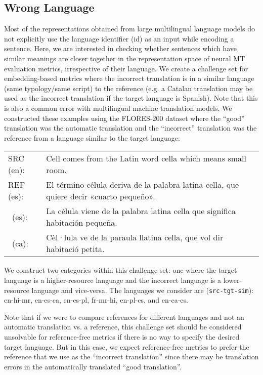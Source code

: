 \documentclass[11pt]{article}
\newcommand{\cmark}{\textcolor{darkpastelgreen}{\ding{51}}}\newcommand{\xmark}{\textcolor{darkpastelred}{\ding{55}}}
\begin{document}
\subsection{Wrong Language}
\label{sec:wrong_language}
Most of the representations obtained from large multilingual language models do not explicitly use the language identifier (id) as an input while encoding a sentence. Here, we are interested in checking whether sentences which have similar meanings are closer together in the representation space of neural MT evaluation metrics, irrespective of their language.  We create a challenge set for embedding-based metrics where the incorrect translation is in a similar language (same typology/same script) to the reference (e.g. a Catalan translation may be used as the incorrect translation if the target language is Spanish). Note that this is also a common error with multilingual machine translation models. We constructed these examples using the FLORES-200 dataset where the ``good'' translation was the automatic translation and the ``incorrect'' translation was the reference from a language similar to the target language:


\begin{small}
\vspace{0.5cm}
\setlength{\extrarowheight}{0.1cm}
\begin{tabularx}{0.95\columnwidth}{lX}
     SRC (en): & Cell comes from the Latin word cella which means small room. \\
     REF (es): & El término célula deriva de la palabra latina cella, que quiere decir «cuarto pequeño». \\
     \cmark\ (es): & La célula viene de la palabra latina cella que significa habitación pequeña. \\
     \xmark\ (ca): & Cèl·lula ve de la paraula llatina cella, que vol dir habitació petita. \vspace{0.35cm}
\end{tabularx}
\end{small}

We construct two categories within this challenge set: one where the target language is a higher-resource language and the incorrect language is a lower-resource language and vice-versa. The languages we consider are (\texttt{src-tgt-sim}): en-hi-mr, en-es-ca, en-cs-pl, fr-mr-hi,  en-pl-cs, and en-ca-es.

Note that if we were to compare references for different languages and not an automatic translation vs. a reference, this challenge set should be considered unsolvable for reference-free metrics if there is no way to specify the desired target language. But in this case, we expect reference-free metrics to prefer the reference that we use as the ``incorrect translation'' since there may be translation errors in the automatically translated ``good translation''.
\end{document}
